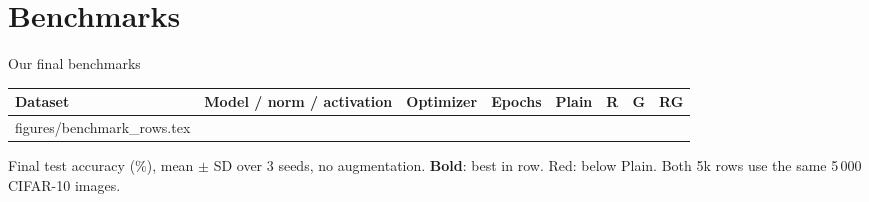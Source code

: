 \documentclass[10pt,aspectratio=169]{beamer}
\makeatletter
\newcommand{\Rm}{\textcolor{cR}{\textbf{R}}}
\newcommand{\Gm}{\textcolor{cG}{\textbf{G}}}
\newcommand{\RGm}{\textcolor{cRG}{\textbf{RG}}}
\newcommand{\rawinput}{\@@input}  %
\makeatother
\begin{document}
\section{Benchmarks}
\begin{frame}{Our final benchmarks}
\centering
{\scriptsize
\setlength{\tabcolsep}{4pt}
\begin{tabular}{@{}lllr cccc@{}}
\toprule
Dataset & Model / norm / activation & Optimizer & Epochs &
Plain & \Rm & \Gm & \RGm \\
\midrule
\rawinput figures/benchmark_rows.tex
\bottomrule
\end{tabular}}

\vspace{0.2cm}
{\scriptsize Final test accuracy (\%), mean $\pm$ SD over 3 seeds, no augmentation.
\textbf{Bold}: best in row. \textcolor{cbad}{Red}: below Plain. Both 5k rows use the same 5\,000 CIFAR-10 images.}
\end{frame}

\end{document}

